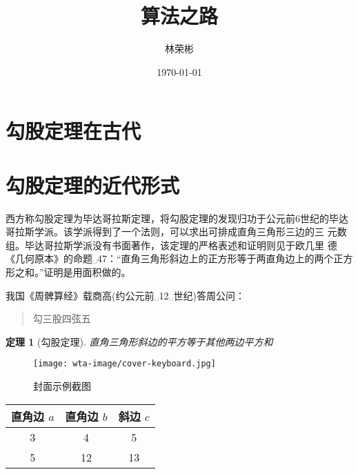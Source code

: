 \documentclass[UTF8]{ctexart}
\title{算法之路}
\author{林荣彬}
\date{\today}
\newtheorem{theorem}{定理}
\begin{document}
\maketitle
\tableofcontents
\section{勾股定理在古代}
\section{勾股定理的近代形式}


西方称勾股定理为毕达哥拉斯定理，将勾股定理的发现归功于公元前6世纪的毕达哥拉斯学派。该学派得到了一个法则，可以求出可排成直角三角形三边的三 元数组。毕达哥拉斯学派没有书面著作，该定理的严格表述和证明则见于欧几里 德《几何原本》的命题␣47：``直角三角形斜边上的正方形等于两直角边上的两个正方形之和。''证明是用面积做的。

我国《周髀算经》载商高(约公元前␣12␣世纪)答周公问：
\begin{quote}
    勾三股四弦五
\end{quote}

\begin{theorem}[勾股定理]
    直角三角形斜边的平方等于其他两边平方和
\end{theorem}

\begin{figure}[ht]
    \centering
    \texttt{[image: wta-image/cover-keyboard.jpg]}
    \caption{封面示例截图}
    \label{fig:xiantu}
\end{figure}

\begin{table}[H]
    \begin{tabular}{|ccc|}
        \hline
        直角边 $a$  &  直角边 $b$  &  斜边 $c$  \\
        \hline
        3 & 4 & 5   \\
        5 & 12 & 13 \\
        \hline
    \end{tabular}
\end{table}
\end{document}
